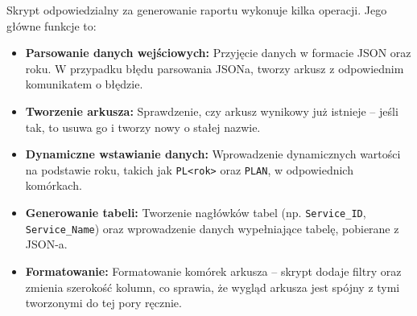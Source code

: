 Skrypt odpowiedzialny za generowanie raportu wykonuje kilka operacji. Jego główne funkcje to:
\begin{itemize}
    \item \textbf{Parsowanie danych wejściowych:} Przyjęcie danych w formacie JSON oraz roku. W przypadku błędu parsowania JSONa, tworzy arkusz z odpowiednim komunikatem o błędzie.
    \item \textbf{Tworzenie arkusza:} Sprawdzenie, czy arkusz wynikowy już istnieje -- jeśli tak, to usuwa go i tworzy nowy o stałej nazwie.
    \item \textbf{Dynamiczne wstawianie danych:} Wprowadzenie dynamicznych wartości na podstawie roku, takich jak \texttt{PL<rok>} oraz \texttt{PLAN}, w odpowiednich komórkach.
    \item \textbf{Generowanie tabeli:} Tworzenie nagłówków tabel (np. \texttt{Service\_ID}, \texttt{Service\_Name}) oraz wprowadzenie danych wypełniające tabelę, pobierane z JSON-a.
    \item \textbf{Formatowanie:} Formatowanie komórek arkusza -- skrypt dodaje filtry oraz zmienia szerokość kolumn, co sprawia, że wygląd arkusza jest spójny z tymi tworzonymi do tej pory ręcznie.
\end{itemize}




